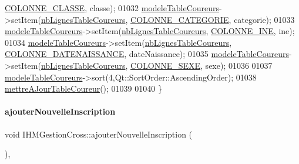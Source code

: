 \begin{DoxyCode}
      \hyperlink{ihmchronocross_8h_a114680edc01528f77bb689b0a2ca18a2}{COLONNE\_CLASSE}, classe);
01032     \hyperlink{class_i_h_m_gestion_cross_ad9560c4804694dbbf969de5f6f56eb30}{modeleTableCoureurs}->setItem(\hyperlink{class_i_h_m_gestion_cross_a0f4f5886077b1c5cbfa9cc0680d0380f}{nbLignesTableCoureurs}, 
      \hyperlink{ihmgestioncross_8h_a24ffa4392b8af69a94a6500ec4a60a7e}{COLONNE\_CATEGORIE}, categorie);
01033     \hyperlink{class_i_h_m_gestion_cross_ad9560c4804694dbbf969de5f6f56eb30}{modeleTableCoureurs}->setItem(\hyperlink{class_i_h_m_gestion_cross_a0f4f5886077b1c5cbfa9cc0680d0380f}{nbLignesTableCoureurs}, 
      \hyperlink{ihmgestioncross_8h_aa8208c9f9fd2ea2418e4b7bb28175f80}{COLONNE\_INE}, ine);
01034     \hyperlink{class_i_h_m_gestion_cross_ad9560c4804694dbbf969de5f6f56eb30}{modeleTableCoureurs}->setItem(\hyperlink{class_i_h_m_gestion_cross_a0f4f5886077b1c5cbfa9cc0680d0380f}{nbLignesTableCoureurs}, 
      \hyperlink{ihmgestioncross_8h_a985c9028f6a7ed4b42d0e93eeef6c28c}{COLONNE\_DATENAISSANCE}, dateNaissance);
01035     \hyperlink{class_i_h_m_gestion_cross_ad9560c4804694dbbf969de5f6f56eb30}{modeleTableCoureurs}->setItem(\hyperlink{class_i_h_m_gestion_cross_a0f4f5886077b1c5cbfa9cc0680d0380f}{nbLignesTableCoureurs}, 
      \hyperlink{ihmgestioncross_8h_a9ef0920ad9f4f65e80e5d9f8e1b263b2}{COLONNE\_SEXE}, sexe);
01036 
01037     \hyperlink{class_i_h_m_gestion_cross_ad9560c4804694dbbf969de5f6f56eb30}{modeleTableCoureurs}->sort(4,Qt::SortOrder::AscendingOrder);
01038     \hyperlink{class_i_h_m_gestion_cross_a53c84315d723d75ad7b4a7d4c317efc5}{mettreAJourTableCoureur}();
01039 
01040 \}
\end{DoxyCode}
\mbox{\label{class_i_h_m_gestion_cross_af0165d32344af78b4edce59f88c90ff6}} 
\paragraph{\texorpdfstring{ajouter\+Nouvelle\+Inscription}{ajouterNouvelleInscription}}
{\footnotesize\ttfamily void I\+H\+M\+Gestion\+Cross\+::ajouter\+Nouvelle\+Inscription (\begin{DoxyParamCaption}{ }\end{DoxyParamCaption})\hspace{0.3cm}{\ttfamily [private]}, {\ttfamily [slot]}}



